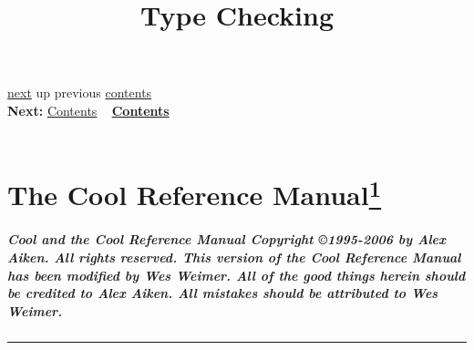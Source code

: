 \documentclass[]{article}
\title{Type Checking}
\author{}
\date{}
\begin{document}
\maketitle

\href{node1.html}{next} up previous \href{node1.html}{contents} \\
\textbf{Next:} \href{node1.html}{Contents} ~
\textbf{\href{node1.html}{Contents}} \\ \\

\section{The Cool Reference
Manual\href{footnode.html\#foot266}{\textsuperscript{1}}}

\subparagraph{Cool and the Cool Reference Manual Copyright ©1995-2006 by
Alex Aiken. All rights reserved. This version of the Cool Reference
Manual has been modified by Wes Weimer. All of the good things herein
should be credited to Alex Aiken. All mistakes should be attributed to
Wes Weimer.}

\begin{center}\rule{3in}{0.4pt}\end{center}
\end{document}
